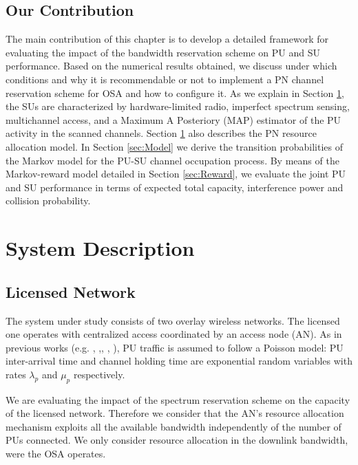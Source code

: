 \subsection{Our Contribution}
The main contribution of this chapter is to develop a detailed framework for evaluating the impact of the bandwidth reservation scheme on PU and SU performance.
Based on the numerical results obtained, we discuss under which conditions and why it is recommendable or not to implement a PN channel reservation scheme for OSA and how to configure it.
As we explain in Section \ref{sec:System}, the SUs are characterized by hardware-limited radio, imperfect spectrum sensing, multichannel access, and a Maximum A Posteriory (MAP) estimator of the PU activity in the scanned channels. Section \ref{sec:System} also describes the PN resource allocation model.
In Section \ref{sec:Model} we derive the transition probabilities of the Markov model for the PU-SU channel occupation process.
By means of the Markov-reward model detailed in Section \ref{sec:Reward}, we evaluate the joint PU and SU performance in terms of expected total capacity, interference power and collision probability.

\section{System Description}\label{sec:System}
\subsection{Licensed Network}
The system under study consists of two overlay wireless networks. The licensed one operates with centralized access coordinated by an access node (AN). 
As in previous works (e.g. \cite{ref:Zhao2007_dec}, \cite{ref:Kim2008},\cite{ref:Gelabert2011}, \cite{ref:Jiao2012}, \cite{ref:Tang2009}), PU traffic is assumed to follow a Poisson model: PU inter-arrival time and channel holding time are exponential random variables with rates $\lambda_{p}$ and $\mu_{p}$ respectively.

We are evaluating the impact of the spectrum reservation scheme on the capacity of the licensed network. Therefore we consider that the AN's resource allocation mechanism exploits all the available bandwidth independently of the number of PUs connected.
We only consider resource allocation in the downlink bandwidth, were the OSA operates.

